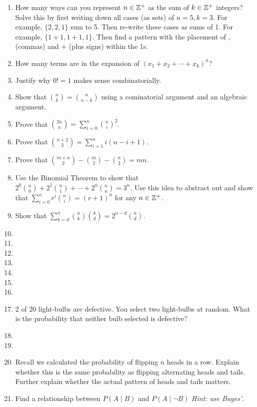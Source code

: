 \documentclass[main.tex]{subfiles}
\begin{document}
\begin{enumerate}
	\item How many ways can you represent \(n \in \mathbb{Z}^+\) as the sum of \(k \in \mathbb{Z}^+\) integers? Solve this by first writing down all cases (as sets) of \(n=5,k=3\). For example, \(\{2,2,1\}\) sum to 5. Then re-write these cases as sums of 1. For example, \(\{1+1,1+1,1\}\). Then find a pattern with the placement of \(,\) (commas) and \(+\) (plus signs) within the 1s.
	\item
	How many terms are in the expansion of \((x_1+x_2+\cdots+x_k)^n\)?
	\item
	Justify why \(0! = 1\) makes sense combinatorially.
	\item Show that \(\binom{n}{k} =  \binom{n}{n-k}\) using a cominatorial argument and an algebraic argument.
	\item Prove that \(\binom{2n}{n} = \sum_{i=0}^{n} \binom{n}{i}^2\).
	\item Prove that \(\binom{n+2}{3} = \sum_{i=1}^{n} i(n-i+1)\).
	\item Prove that \(\binom{m+n}{2} - \binom{m}{2} - \binom{n}{2} = mn\).
	\item Use the Binomial Theorem to show that \(2^0\binom{n}{0} + 2^1\binom{n}{1} + \cdots + 2^n\binom{n}{n} = 3^n\).
	Use this idea to abstract out and show that \(\sum_{i=0}^{n} r^i \binom{n}{i} = (r+1)^n\) for any \(n \in \mathbb{Z}^+\).
	\item
	Show that \(\sum_{k=d}^{n} \binom{n}{k}\binom{k}{d} = 2^{n-d}\binom{n}{d}\).
	\item %
	\item %
	\item %
	\item %
	\item %
	\item %
	\item %
	\item 2 of 20 light-bulbs are defective. You select two light-bulbs at random. What is the probability that neither bulb selected is defective? %
	\item %
	\item %
	\item Recall we calculated the probability of flipping \(n\) heads in a row. Explain whether this is the same probability as flipping alternating heads and tails. Further explain whether the actual pattern of heads and tails matters.
	\item Find a relationship between \(P(A \mid B)\) and \(P(A \mid \lnot B)\) \textit{Hint: use Bayes'}.
	

\end{enumerate}
\end{document}

